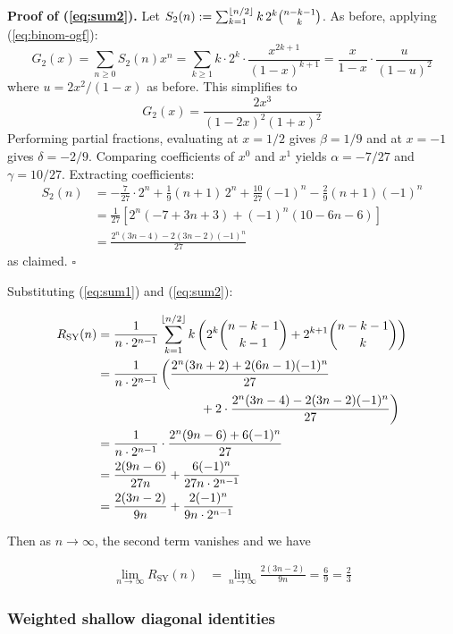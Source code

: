 \documentclass[referee,lineno,pdflatex,sn-mathphys-ay]{sn-jnl}
\DeclarePairedDelimiter\floor{\lfloor}{\rfloor}
\begin{document}
\textbf{Proof of (\ref{eq:sum2}).} Let $S_2(n) := \sum_{k=1}^{\floor{n/2}} k\, 2^k \binom{n-k-1}{k}$. As before, applying (\ref{eq:binom-ogf}):
\[
G_2(x) = \sum_{n \ge 0} S_2(n) x^n = \sum_{k \ge 1} k \cdot 2^k \cdot \frac{x^{2k+1}}{(1-x)^{k+1}} = \frac{x}{1-x} \cdot \frac{u}{(1-u)^2}
\]
where $u = 2x^2/(1-x)$ as before. This simplifies to
\[
G_2(x) = \frac{2x^3}{(1-2x)^2(1+x)^2}
\]
Performing partial fractions, evaluating at $x = 1/2$ gives $\beta = 1/9$ and at $x = -1$ gives $\delta = -2/9$. Comparing coefficients of $x^0$ and $x^1$ yields $\alpha = -7/27$ and $\gamma = 10/27$. Extracting coefficients:
\begin{align*}
S_2(n) &= -\frac{7}{27}\cdot 2^n + \frac{1}{9}(n+1)\,2^n + \frac{10}{27}(-1)^n - \frac{2}{9}(n+1)(-1)^n \\
&= \frac{1}{27}\left[2^n(-7+3n+3) + (-1)^n(10-6n-6)\right] \\
&= \frac{2^n(3n-4) - 2(3n-2)(-1)^n}{27}
\end{align*}
as claimed. $\square$

Substituting (\ref{eq:sum1}) and (\ref{eq:sum2}):

\begin{align}
 R_{\text{SY}}(n) &= \frac{1}{n \cdot 2^{n-1}}\sum_{k=1}^{\floor{n/2}} k \left( 2^k \binom{n-k-1}{k-1} + 2^{k+1} \binom{n-k-1}{k} \right) \\
 &= \frac{1}{n \cdot 2^{n-1}} \left(
 \frac{2^n (3n+2) + 2(6n-1)(-1)^n}{27} \right. \nonumber\\
 &\hspace{8em}\left. {}+ 2 \cdot \frac{2^n (3n-4)-2(3n-2)(-1)^n}{27} \right) \\
 &= \frac{1}{n \cdot 2^{n-1}} \cdot \frac{2^n(9n-6) + 6(-1)^n}{27} \\
 &= \frac{2(9n-6)}{27n} + \frac{6(-1)^n}{27n \cdot 2^{n-1}} \\
 &= \frac{2(3n-2)}{9n} + \frac{2(-1)^n}{9n \cdot 2^{n-1}}
\end{align}

Then as $n \rightarrow \infty$, the second term vanishes and we have

\begin{align}
    \lim_{n \rightarrow \infty} R_{\text{SY}}(n) &= \lim_{n \rightarrow \infty} \frac{2(3n-2)}{9n} = \frac{6}{9} = \frac{2}{3}
\end{align}

\subsubsection{Weighted shallow diagonal identities}
\end{document}
